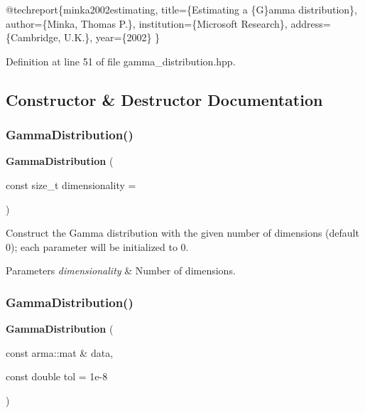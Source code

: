 \begin{DoxyCode}
@techreport\{minka2002estimating,
  title=\{Estimating a \{G\}amma distribution\},
  author=\{Minka, Thomas P.\},
  institution=\{Microsoft Research\},
  address=\{Cambridge, U.K.\},
  year=\{2002\}
\}
\end{DoxyCode}
 

Definition at line 51 of file gamma\+\_\+distribution.\+hpp.



\subsection{Constructor \& Destructor Documentation}
\mbox{\label{classmlpack_1_1distribution_1_1GammaDistribution_aad5c9deb1c53fda3075ce214ec9f68c2}} 
\subsubsection{Gamma\+Distribution()\hspace{0.1cm}{\footnotesize\ttfamily [1/3]}}
{\footnotesize\ttfamily \textbf{ Gamma\+Distribution} (\begin{DoxyParamCaption}\item[{const size\+\_\+t}]{dimensionality = {} }\end{DoxyParamCaption})}



Construct the Gamma distribution with the given number of dimensions (default 0); each parameter will be initialized to 0. 


\begin{DoxyParams}{Parameters}
{\em dimensionality} & Number of dimensions. \\
\hline
\end{DoxyParams}
\mbox{\label{classmlpack_1_1distribution_1_1GammaDistribution_ae89433aa9673a783c3da50e1c8370def}} 
\subsubsection{Gamma\+Distribution()\hspace{0.1cm}{\footnotesize\ttfamily [2/3]}}
{\footnotesize\ttfamily \textbf{ Gamma\+Distribution} (\begin{DoxyParamCaption}\item[{const arma\+::mat \&}]{data,  }\item[{const double}]{tol = {\ttfamily 1e-\/8} }\end{DoxyParamCaption})}




